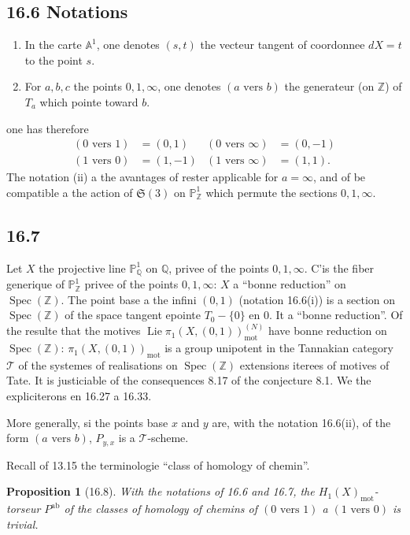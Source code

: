 \documentclass[12pt,a4paper]{article}
\theoremstyle{plain}
\newtheorem{proposition}[theorem]{Proposition}
\theoremstyle{definition}
\theoremstyle{remark}
\DeclareMathOperator{\Spec}{Spec}
\DeclareMathOperator{\Lie}{Lie}
\newcommand{\bZ}{\mathbb{Z}}
\newcommand{\bQ}{\mathbb{Q}}
\newcommand{\bP}{\mathbb{P}}
\newcommand{\bA}{\mathbb{A}}
\newcommand{\mot}{\mathrm{mot}}
\begin{document}
\subsection*{16.6 Notations}
\begin{enumerate}[label=(\roman*), nosep]
\item In the carte $\bA^1$, one denotes $(s, t)$ the vecteur tangent of coordonnee $dX = t$ to the point $s$.
\item For $a, b, c$ the points $0, 1, \infty$, one denotes $(a \text{ vers } b)$ the generateur (on $\bZ$) of $T_a$ which pointe toward $b$.
\end{enumerate}

one has therefore
\begin{align*}
(0 \text{ vers } 1) &= (0, 1) & (0 \text{ vers } \infty) &= (0, -1) \\
(1 \text{ vers } 0) &= (1, -1) & (1 \text{ vers } \infty) &= (1, 1).
\end{align*}
The notation (ii) a the avantages of rester applicable for $a = \infty$, and of be compatible a the action of $\mathfrak{S}(3)$ on $\bP^1_{\bZ}$ which permute the sections $0, 1, \infty$.

\subsection*{16.7}

Let $X$ the projective line $\bP^1_{\bQ}$ on $\bQ$, privee of the points $0, 1, \infty$. C'is the fiber generique of $\bP^1_{\bZ}$ privee of the points $0, 1, \infty$: $X$ a ``bonne reduction'' on $\Spec(\bZ)$. The point base a the infini $(0, 1)$ (notation 16.6(i)) is a section on $\Spec(\bZ)$ of the space tangent epointe $T_0 - \{0\}$ en $0$. It a ``bonne reduction''. Of the resulte that the motives $\Lie \pi_1(X, (0, 1))_{\mot}^{(N)}$ have bonne reduction on $\Spec(\bZ)$: $\pi_1(X, (0, 1))_{\mot}$ is a group unipotent in the Tannakian category $\mathcal{T}$ of the systemes of realisations on $\Spec(\bZ)$ extensions iterees of motives of Tate. It is justiciable of the consequences 8.17 of the conjecture 8.1. We the expliciterons en 16.27 a 16.33.

More generally, si the points base $x$ and $y$ are, with the notation 16.6(ii), of the form $(a \text{ vers } b)$, $P_{y,x}$ is a $\mathcal{T}$-scheme.

Recall of 13.15 the terminologie ``class of homology of chemin''.

\begin{proposition}[16.8]
With the notations of 16.6 and 16.7, the $H_1(X)_{\mot}$-torseur $P^{\text{ab}}$ of the classes of homology of chemins of $(0 \text{ vers } 1)$ a $(1 \text{ vers } 0)$ is trivial.
\end{proposition}
\end{document}
